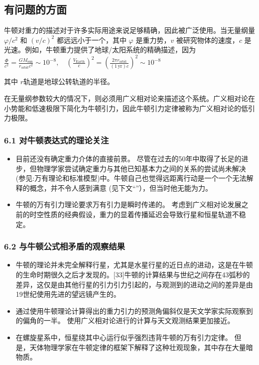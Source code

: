 \subsection{有问题的方面}

牛顿对重力的描述对于许多实际用途来说足够精确，因此被广泛使用。当无量纲量 $\varphi/c^2$ 和 $(v/c)^2$ 都远远小于一个，其中 $\varphi$ 是重力势，$v$ 被研究物体的速度，$c$ 是光速。例如，牛顿重力提供了地球/太阳系统的精确描述，因为
$\frac{\Phi}{c^2} = \frac{GM_{\text{sun}}}{r_{\text{orbit}} c^2} \sim 10^{-8}, \quad \left(\frac{V_{\text{Earth}}}{c}\right)^2 = \left(\frac{2 \pi r_{\text{orbit}}}{(1 \, \text{yr}) c}\right)^2 \sim 10^{-8}$

其中 $r$轨道是地球公转轨道的半径。

在无量纲参数较大的情况下，则必须用广义相对论来描述这个系统。广义相对论在小势能和低速极限下简化为牛顿引力，因此牛顿引力定律被称为广义相对论的低引力极限。

\subsubsection{6.1 对牛顿表达式的理论关注}

\begin{itemize}
\item 目前还没有确定重力介体的直接前景。 尽管在过去的50年中取得了长足的进步，但物理学家尝试确定重力与其他已知基本力之间的关系的尝试尚未解决(参见:万有理论和标准模型)中。牛顿自己也觉得远距离行动是一个一个无法解释的概念，并不令人感到满意 (见下文“”），但当时他无能为力。
\item 牛顿的万有引力理论要求万有引力是瞬时传递的。 考虑到广义相对论发展之前的时空性质的经典假设，重力的显着传播延迟会导致行星和恒星轨道不稳定。
\end{itemize}

\subsubsection{6.2 与牛顿公式相矛盾的观察结果}

\begin{itemize}
\item 牛顿的理论并未完全解释行星，尤其是水星行星的近日点的进动，这是在牛顿的生命时期很久之后才发现的。[33]牛顿的计算结果与世纪之间存在43弧秒的差异，这仅是由其他行星的引力引力引起的，与观测到的进动之间的差异是由19世纪使用先进的望远镜产生的。
\item 通过使用牛顿理论计算得出的重力引力的预测角偏斜仅是天文学家实际观察到的偏角的一半。 使用广义相对论进行的计算与天文观测结果更加接近。
\item 在螺旋星系中，恒星绕其中心运行似乎强烈违背牛顿的万有引力定律。 但是，天体物理学家在牛顿定律的框架下解释了这种壮观现象，其中存在大量暗物质。
\end{itemize}

